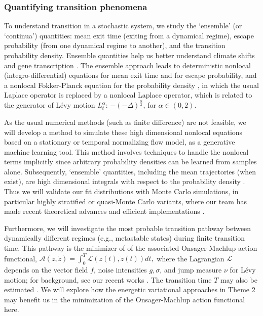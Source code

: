 \documentclass[11pt]{NSFamsart}
\begin{document}
\subsubsection*{Quantifying transition phenomena}
To understand transition   in    a stochastic system, we  study the     `ensemble' (or `continua') quantities: mean exit time (exiting from a dynamical regime),   escape probability (from one dynamical regime to another), and  the transition  probability density. Ensemble quantities help us better understand  climate shifts \cite{ZhengYY2020} and  gene transcription \cite{ChenWuDuan}. 
The ensemble approach leads to deterministic  nonlocal (integro-differential) equations for mean exit time and for escape probability, and a nonlocal Fokker-Planck equation for the probability density \cite{DuanBook2015},
in which the usual Laplace operator is replaced
by a nonlocal Laplace operator, which is related to the generator of L\'evy motion $L_t^\alpha$:  $-(-\Delta)^{\frac{\alpha}2  }$, for $\alpha \in (0, 2)$.
 
 
As the usual numerical methods (such as finite difference) are not feasible, we will develop a method to simulate these high dimensional nonlocal equations based on a stationary or temporal normalizing flow model, as a  generative machine learning tool.    This method involves techniques to handle the nonlocal terms implicitly since arbitrary probability densities can be learned from samples alone. Subsequently, `ensemble' quantities, including the mean trajectories (when exist), are high dimensional integrals with respect to the probability density \cite{DuanBook2015}.  Thus we will validate our fit distributions with Monte Carlo simulations, in particular highly stratified or quasi-Monte Carlo variants, where our team has made recent theoretical advances \cite{Hic17a, HicEtal17a} and efficient implementations \cite{QMCPy2020a}. 

Furthermore, we will investigate the most probable transition pathway between dynamically different regimes (e.g., metastable states) during finite transition time. This pathway is the minimizer of  
of the associated Onsager-Machlup action functional, $\mathcal{A}(z, \dot z) = \int_0^T \mathcal{L}(z(t), \dot z(t)) dt,$ where the Lagrangian  $\mathcal{L}$ depends on the vector field $f$, noise intensities $g, \sigma$, and  jump measure $\nu$ for L\'evy motion; for background, see   our recent works \cite{ChaoDuanOM,HuangYF}. The   transition time $T$ may also be estimated \cite{HuangYF2020}. We will explore how the energetic variational approaches in Theme 2 may benefit us in the minimization of the Onsager-Machlup action functional here. 
\end{document}
